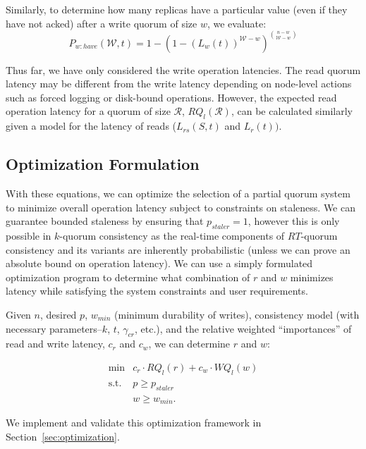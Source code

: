 \documentclass{vldb}
\begin{document}
Similarly, to determine how many replicas have a particular value (even if they have not acked) after a write quorum of size $w$, we evaluate:
\begin{equation}
P_{w:have}(\mathcal{W}, t) = 1-(1-(L_w(t))^{\mathcal{W}-w})^{n-w \choose \mathcal{W}-w}
\end{equation}

Thus far, we have only considered the write operation latencies.  The
read quorum latency may be different from the write latency depending
on node-level actions such as forced logging or disk-bound operations.
However, the expected read operation latency for a quorum of size
$\mathcal{R}$, $RQ_l(\mathcal{R})$, can be calculated similarly given a
model for the latency of reads ($L_{rs}(S,t)$ and $L_r(t))$.

\subsection{Optimization Formulation}

With these equations, we can optimize the selection of a partial
quorum system to minimize overall operation latency subject to
constraints on staleness. We can guarantee bounded staleness by
ensuring that $p_{staler} = 1$, however this is only possible in
$k$-quorum consistency as the real-time components of $RT$-quorum
consistency and its variants are inherently probabilistic (unless we
can prove an absolute bound on operation latency).  We can use a
simply formulated optimization program to determine what combination
of $r$ and $w$ minimizes latency while satisfying the system
constraints and user requirements.

Given $n$, desired $p$, $w_{min}$ (minimum durability of writes),
consistency model (with necessary parameters--$k$, $t$, $\gamma_{cr}$,
etc.), and the relative weighted ``importances'' of read
and write latency, $c_r$ and $c_w$, we can determine $r$ and $w$:

\begin{equation}
 \begin{array}{rl}
    \min        & c_r\cdot RQ_l(r) +c_w \cdot WQ_l(w) \\
    \mbox{s.t.} & p \ge p_{staler} \\
                & w \ge w_{min}.
    \end{array}
\end{equation}

We implement and validate this optimization framework in
Section~\ref{sec:optimization}.
\end{document}
